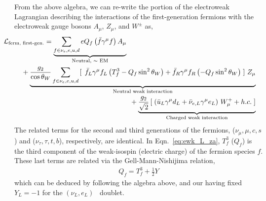 From the above algebra, we can re-write the portion of the electroweak Lagrangian describing the
interactions of the first-generation fermions with the electroweak gauge bosons $A_{\mu}$,
$Z_{\mu}$, and $W^{\pm}$ as,
\begin{equation}
\begin{multlined}
\hspace{-0.9cm}\mathcal{L}_{\text{ferm, first-gen.}} = \underbrace{\sum\limits_{f \in \nu_e, e, u, d} e Q_f
\left(\bar{f}\gamma^{\mu} f \right) A_{\mu}}_\text{Neutral, $\sim$ EM}  \\
+ \underbrace{\frac{g_2}{\cos \theta_W} \sum\limits_{f \in \nu_e, e, u, d} \left[ \,\right.\bar{f}_L \gamma^{\mu} f_L
\left( T_f^3 -  Q_f \sin^2 \theta_W \right)
+ \bar{f}_R \gamma^{\mu} f_R \left(-Q_f \sin^2 \theta_W \right) \left. \right]\, Z_{\mu}}_\text{Neutral weak interaction} \\
+ \underbrace{\frac{g_2}{\sqrt{2}} \left[ \right. \left( \bar{u}_L \gamma^{\mu} d_L + \bar{\nu}_{e,L} \gamma^{\mu} e_L \right) \, W_{\mu}^+ + h.c. \left. \right]}_\text{Charged weak interaction}
\end{multlined}
\label{eq:ewk_L_za}
\end{equation}
The related terms for the second and third generations of the fermions,
($\nu_{\mu}, \mu, c, s$) and ($\nu_{\tau}, \tau, t, b$), respectively, are identical.
In Eqn.~\ref{eq:ewk_L_za}, $T_f^3$ ($Q_f$) is the third component of the weak-isospin (electric charge)
of the fermion species $f$. These last terms are related via the Gell-Mann-Nishijima relation,
\begin{align}
	Q_f = T_f^3 + \frac{1}{2}Y
	\label{eq:gell_mann_nishijima}
\end{align}
which can be deduced by following the algebra above, and our having fixed $Y_L = -1$ for
the $(\nu_L, e_L)$ \SUtwo~doublet.

